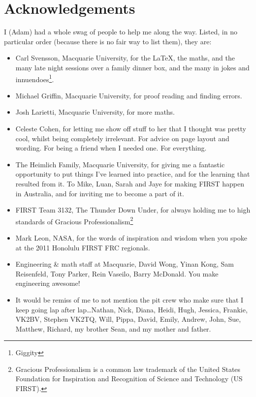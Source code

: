 \newpage
\chapter{Acknowledgements}
\label{sec:Acknowledgements}
I (Adam) had a whole swag of people to help me along the way. Listed, in no
particular order (because there is no fair way to list them), they are:
\begin{itemize}
  \item Carl Svensson, Macquarie University, for the \LaTeX, the maths, and the
  many late night sessions over a family dinner box, and the many in jokes and
  innuendoes\footnote{Giggity}.
  \item Michael Griffin, Macquarie University, for proof reading and finding
  errors.
  \item Josh Larietti, Macquarie University, for more maths.
  \item Celeste Cohen, for letting me show off stuff to her that I thought
  was pretty cool, whilst being completely irrelevant. For advice on page
  layout and wording. For being a friend when I needed one. For everything.
  \item The Heimlich Family, Macquarie University, for giving me a fantastic
  opportunity to put things I've learned into practice, and for the learning
  that resulted from it. To Mike, Luan, Sarah and Jaye for making FIRST happen
  in Australia, and for inviting me to become a part of it.
  \item FIRST Team 3132, The Thunder Down Under, for always holding me to high
  standards of Gracious Professionalism\texttrademark\footnote{Gracious
  Professionalism is a common law trademark of the United States Foundation for
  Inspiration and Recognition of Science and Technology (US FIRST).}
  \item Mark Leon, NASA, for the words of inspiration and wisdom when you
  spoke at the 2011 Honolulu FIRST FRC regionals. 
  \item Engineering \& math staff at Macquarie, David Wong, Yinan Kong, Sam
  Reisenfeld, Tony Parker, Rein Vaseilo, Barry McDonald. You make engineering
  awesome!
  \item It would be remiss of me to not mention the pit crew who make
  sure that I keep going lap after lap\ldots Nathan, Nick, Diana, Heidi, Hugh,
  Jessica, Frankie, VK2BV, Stephen VK2TQ, Will, Pippa, David, Emily, Andrew,
  John, Sue, Matthew, Richard, my brother Sean, and my mother and father.
\end{itemize}


%
